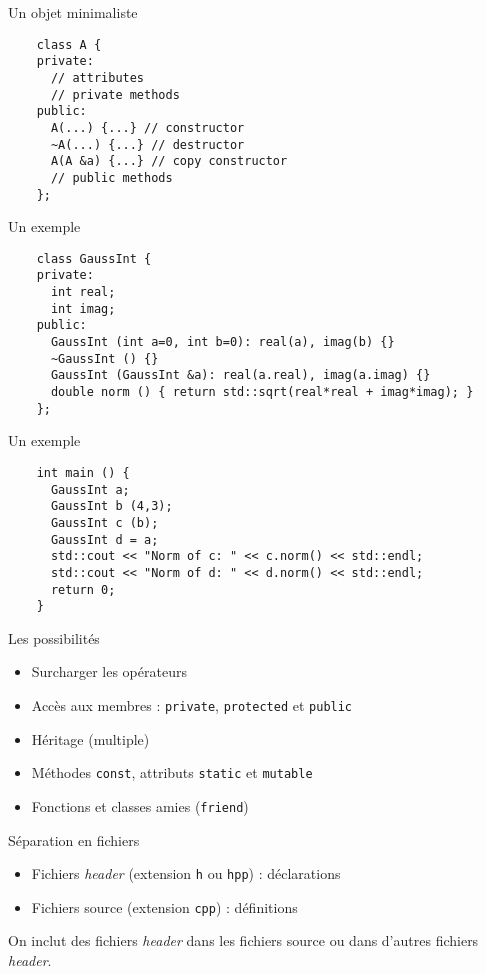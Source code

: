 \begin{frame}[fragile]{Un objet minimaliste}
  \begin{lstlisting}
    class A {
    private:
      // attributes
      // private methods
    public:
      A(...) {...} // constructor
      ~A(...) {...} // destructor
      A(A &a) {...} // copy constructor
      // public methods
    };
  \end{lstlisting}
\end{frame}

\begin{frame}[fragile]{Un exemple}
  \begin{lstlisting}
    class GaussInt {
    private:
      int real;
      int imag;
    public:
      GaussInt (int a=0, int b=0): real(a), imag(b) {}
      ~GaussInt () {}
      GaussInt (GaussInt &a): real(a.real), imag(a.imag) {}
      double norm () { return std::sqrt(real*real + imag*imag); }
    };
  \end{lstlisting}
\end{frame}

\begin{frame}[fragile]{Un exemple}
  \begin{lstlisting}
    int main () {
      GaussInt a;
      GaussInt b (4,3);
      GaussInt c (b);
      GaussInt d = a;
      std::cout << "Norm of c: " << c.norm() << std::endl;
      std::cout << "Norm of d: " << d.norm() << std::endl;
      return 0;
    }
  \end{lstlisting}
\end{frame}

\begin{frame}{Les possibilités}
  \begin{itemize}
  \item Surcharger les opérateurs
  \item Accès aux membres : \texttt{private}, \texttt{protected} et \texttt{public}
  \item Héritage (multiple)
  \item Méthodes \texttt{const}, attributs \texttt{static} et \texttt{mutable}
  \item Fonctions et classes amies (\texttt{friend})
  \end{itemize}
\end{frame}

\begin{frame}{Séparation en fichiers}
  \begin{itemize}
  \item Fichiers \textit{header} (extension \texttt{h} ou \texttt{hpp}) : déclarations
  \item Fichiers source (extension \texttt{cpp}) : définitions
  \end{itemize}

  On inclut des fichiers \textit{header} dans les fichiers source ou dans d'autres fichiers \textit{header}.
\end{frame}

